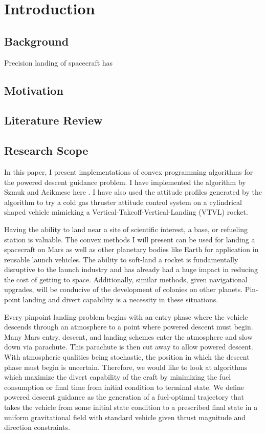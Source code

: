 \chapter{Introduction}
\label{introchap}



\section{Background}

Precision landing of spacecraft has 



\section{Motivation}

\section{Literature Review}


\section{Research Scope}




In this paper, I present implementations of convex programming algorithms for the powered descent guidance problem. I have implemented the algorithm by Szmuk and Acikmese here \cite{}. I have also used the attitude profiles generated by the algorithm to try a cold gas thruster attitude control system on a cylindrical shaped vehicle mimicking a Vertical-Takeoff-Vertical-Landing (VTVL) rocket.

Having the ability to land near a site of scientific interest, a base, or refueling station is valuable. The convex methods I will present can be used for landing a spacecraft on Mars as well as other planetary bodies like Earth for application in reusable launch vehicles. The ability to soft-land a rocket is fundamentally disruptive to the launch industry and has already had a huge impact in reducing the cost of getting to space. Additionally, similar methods, given navigational upgrades, will be conducive of the development of colonies on other planets. Pin-point landing and divert capability is a necessity in these situations.

Every pinpoint landing problem begins with an entry phase where the vehicle descends through an atmosphere to a point where powered descent must begin. Many Mars entry, descent, and landing schemes enter the atmosphere and slow down via parachute. This parachute is then cut away to allow powered descent. With atmospheric qualities being stochastic, the position in which the descent phase must begin is uncertain. Therefore, we would like to look at algorithms which maximize the divert capability of the craft by minimizing the fuel consumption or final time from initial condition to terminal state. We define powered descent guidance as the generation of a fuel-optimal trajectory that takes the vehicle from some initial state condition to a prescribed final state in a uniform gravitational field with standard vehicle given thrust magnitude and direction constraints.


